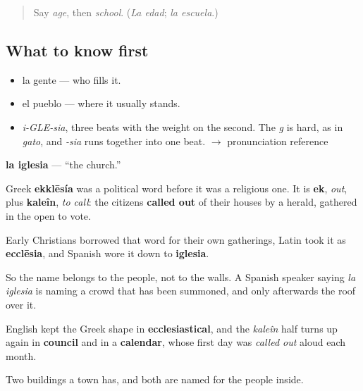 \label{lesson:ES-C346-iglesia}



\begin{quote}
Say \emph{age}, then \emph{school}. (\emph{La edad}; \emph{la escuela}.)
\end{quote}

\subsection*{What to know first}
\begin{itemize}
\raggedright
  \item la gente — who fills it.
  \item el pueblo — where it usually stands.
\end{itemize}

\begin{sounds}
\begin{itemize}
\raggedright
  \item \emph{i-GLE-sia}, three beats with the weight on the second. The \emph{g} is hard, as in \emph{gato}, and \emph{-sia} runs together into one beat. $\to$ pronunciation reference
\end{itemize}
\end{sounds}

\begin{cousinweb}
\textbf{la iglesia} — \textquotedblleft{}the church.\textquotedblright{}

Greek \textbf{ekklēsía} was a political word before it was a religious one. It is \textbf{ek}, \emph{out}, plus \textbf{kaleîn}, \emph{to call}: the citizens \textbf{called out} of their houses by a herald, gathered in the open to vote.

Early Christians borrowed that word for their own gatherings, Latin took it as \textbf{ecclēsia}, and Spanish wore it down to \textbf{iglesia}.

So the name belongs to the people, not to the walls. A Spanish speaker saying \emph{la iglesia} is naming a crowd that has been summoned, and only afterwards the roof over it.

English kept the Greek shape in \textbf{ecclesiastical}, and the \emph{kaleîn} half turns up again in \textbf{council} and in a \textbf{calendar}, whose first day was \emph{called out} aloud each month.
\end{cousinweb}

\begin{grammarlens}[title={What you've built}]
Two buildings a town has, and both are named for the people inside.
\end{grammarlens}

